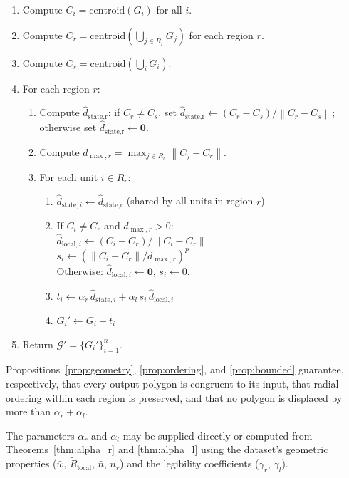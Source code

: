 \documentclass[12pt, a4paper]{article}
\numberwithin{equation}{section}
\theoremstyle{definition}
\theoremstyle{plain}
\theoremstyle{remark}
\newcommand{\norm}[1]{\left\|#1\right\|}
\newcommand{\dhat}[1]{\hat{d}_{\text{#1}}}
\newcommand{\dhati}[1]{\hat{d}_{\text{#1},i}}
\begin{document}
\begin{enumerate}[label=\arabic*.]
  \item Compute $C_i = \mathrm{centroid}(G_i)$ for all $i$.
  \item Compute $C_r = \mathrm{centroid}\!\left(\bigcup_{j \in R_r} G_j\right)$ for each region $r$.
  \item Compute $C_s = \mathrm{centroid}\!\left(\bigcup_{i} G_i\right)$.
  \item For each region $r$:
  \begin{enumerate}[label=4.\arabic*.]
    \item Compute $\dhat{state,r}$: if $C_r \neq C_s$, set $\dhat{state,r} \leftarrow (C_r - C_s)/\norm{C_r - C_s}$; otherwise set $\dhat{state,r} \leftarrow \mathbf{0}$.
    \item Compute $d_{\max,r} = \max_{j \in R_r} \norm{C_j - C_r}$.
    \item For each unit $i \in R_r$:
    \begin{enumerate}[label=4.3.\arabic*.]
      \item $\dhati{state} \leftarrow \dhat{state,r}$ \quad (shared by all units in region $r$)
      \item If $C_i \neq C_r$ and $d_{\max,r} > 0$:\\
        \quad $\dhati{local} \leftarrow (C_i - C_r) / \norm{C_i - C_r}$\\
        \quad $s_i \leftarrow (\norm{C_i - C_r} / d_{\max,r})^p$\\
        Otherwise: $\dhati{local} \leftarrow \mathbf{0}$, \; $s_i \leftarrow 0$.
      \item $t_i \leftarrow \alpha_r\,\dhati{state} + \alpha_l\,s_i\,\dhati{local}$
      \item $G_i' \leftarrow G_i + t_i$
    \end{enumerate}
  \end{enumerate}
  \item Return $\mathcal{G}' = \{G_i'\}_{i=1}^n$.
\end{enumerate}

\bigskip\noindent
Propositions~\ref{prop:geometry}, \ref{prop:ordering}, and \ref{prop:bounded} guarantee, respectively, that every output polygon is congruent to its input, that radial ordering within each region is preserved, and that no polygon is displaced by more than $\alpha_r + \alpha_l$.

The parameters $\alpha_r$ and $\alpha_l$ may be supplied directly or computed from Theorems~\ref{thm:alpha_r} and \ref{thm:alpha_l} using the dataset's geometric properties ($\bar{w}$, $\widetilde{R}_{\text{local}}$, $\bar{n}$, $n_r$) and the legibility coefficients ($\gamma_r$, $\gamma_l$).
\end{document}
